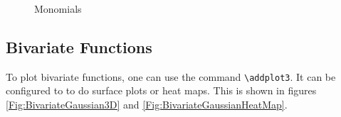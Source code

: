 \begin{figure}[h]
\centering
\caption{Monomials}
\label{Fig:MultiplotPoles}

\pgfplotsset{width=7cm,compat=1.18}
\end{figure}




\subsection{Bivariate Functions}
To plot bivariate functions, one can use the command \verb|\addplot3|. It can be configured to to do surface plots or heat maps. This is shown in figures \ref{Fig:BivariateGaussian3D} and \ref{Fig:BivariateGaussianHeatMap}. 

